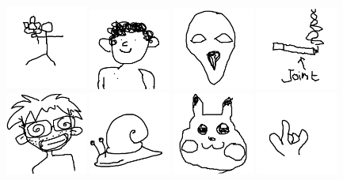 \includegraphics[width=0.2\textwidth]{art/Safari_45.png}
\includegraphics[width=0.2\textwidth]{art/Safari_46.png}
\includegraphics[width=0.2\textwidth]{art/Safari_47.png}
\includegraphics[width=0.2\textwidth]{art/Safari_48.png}
\includegraphics[width=0.2\textwidth]{art/Safari_49.png}
\includegraphics[width=0.2\textwidth]{art/Safari_5.png}
\includegraphics[width=0.2\textwidth]{art/Safari_50.png}
\includegraphics[width=0.2\textwidth]{art/Safari_51.png}
